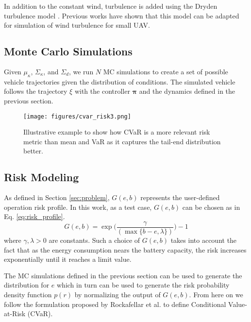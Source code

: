\documentclass[letterpaper, 10 pt, conference]{ieeeconf}
\begin{document}
In addition to the constant wind, turbulence is added using the Dryden turbulence model \cite{mil}. 
Previous works \cite{abichandani2020wind,wasland2009, allison2018, Beard2012SmallUA} have shown that this model can be adapted for simulation of wind turbulence for small UAV.

\subsection{Monte Carlo Simulations}
\label{sec:mc}

Given $\mu_{\kappa}$, $\Sigma_{\kappa}$, and $\Sigma_{d}$, we run $N$ MC simulations to create a set of possible vehicle trajectories given the distribution of conditions. 
The simulated vehicle follows the trajectory $\xi$ with the controller $\mathbf{\pi}$ and the dynamics defined in the previous section.
\begin{figure*}
    \centering
    \texttt{[image: figures/cvar\_risk3.png]}
    \caption{Illustrative example to show how CVaR is a more relevant risk metric than mean and VaR as it captures the tail-end distribution better. }
    \label{fig:cvar_risk}
    \vspace{-2.5mm}
\end{figure*}





\subsection{Risk Modeling}
\label{sec:risk}

As defined in Section \ref{sec:problem}, $G(e,b)$ represents the user-defined operation risk profile. In this work, as a test case, $G(e,b)$ can be chosen as in Eq. \ref{eq:risk_profile}.
\begin{equation}
    G(e,b) = \exp\Bigg(\frac{\gamma}{(\max\{b-e,\lambda\})}\Bigg)-1
    \label{eq:risk_profile}
\end{equation}
where $\gamma, \lambda > 0$ are constants. Such a choice of $G(e,b)$ takes into account the fact that as the energy consumption nears the battery capacity, the risk increases exponentially until it reaches a limit value. 
\par The MC simulations defined in the previous section can be used to generate the distribution for $e$ which in turn can be used to generate the risk probability density function $p(r)$ by normalizing the output of $G(e,b)$. From here on we follow the formulation proposed by Rockafellar et al. \cite{rockafellar2000optimization} to define Conditional Value-at-Risk (CVaR).
\end{document}
